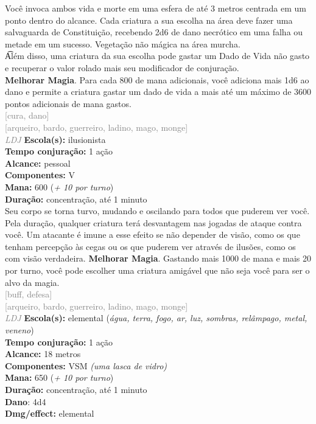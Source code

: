 \documentclass{RPG_Adventure}[2021/10/20]
\begin{document}
{\normalsize Você invoca ambos vida e morte em uma esfera de até 3 metros centrada em um ponto dentro do alcance. Cada criatura a sua escolha na área deve fazer uma salvaguarda de Constituição, recebendo 2d6 de dano necrótico em uma falha ou metade em um sucesso. Vegetação não mágica na área murcha.\\\t Além disso, uma criatura da sua escolha pode gastar um Dado de Vida não gasto e recuperar o valor rolado mais seu modificador de conjuração.\\\t \textbf{Melhorar Magia}. Para cada 800 de mana adicionais, você adiciona mais 1d6 ao dano e permite a criatura gastar um dado de vida a mais até um máximo de 3600 pontos adicionais de mana gastos.\\}
{\scriptsize \textcolor{gray}{[cura, dano]\\}}
{\scriptsize \textcolor{gray}{[arqueiro, bardo, guerreiro, ladino, mago, monge]\\}}
{\tiny \textcolor{gray}{\textit{LDJ}}}
{\small \t \textbf{Escola(s):} ilusionista\\\t \textbf{Tempo conjuração:} 1 ação\\\t \textbf{Alcance:} pessoal\\\t \textbf{Componentes:} V\\\t \textbf{Mana:} 600 (\textit{+ 10 por turno})\\\t \textbf{Duração:} concentração, até 1 minuto\\}
{\normalsize Seu corpo se torna turvo, mudando e oscilando para todos que puderem ver você. Pela duração, qualquer criatura terá desvantagem nas jogadas de ataque contra você. Um atacante é imune a esse efeito se não depender de visão, como os que tenham percepção às cegas ou os que puderem ver através de ilusões, como os com visão verdadeira. \textbf{Melhorar Magia}. Gastando mais 1000 de mana e mais 20 por turno, você pode escolher uma criatura amigável que não seja você para ser o alvo da magia.\\}
{\scriptsize \textcolor{gray}{[buff, defesa]\\}}
{\scriptsize \textcolor{gray}{[arqueiro, bardo, guerreiro, ladino, mago, monge]\\}}
{\tiny \textcolor{gray}{\textit{LDJ}}}
{\small \t \textbf{Escola(s):} elemental (\textit{água, terra, fogo, ar, luz, sombras, relâmpago, metal, veneno})\\\t \textbf{Tempo conjuração:} 1 ação\\\t \textbf{Alcance:} 18 metros\\\t \textbf{Componentes:} VSM \textit{(uma lasca de vidro)}\\\t \textbf{Mana:} 650 (\textit{+ 10 por turno})\\\t \textbf{Duração:} concentração, até 1 minuto\\\t \textbf{Dano}: 4d4\\\t \textbf{Dmg/effect:} elemental\\}
\end{document}
